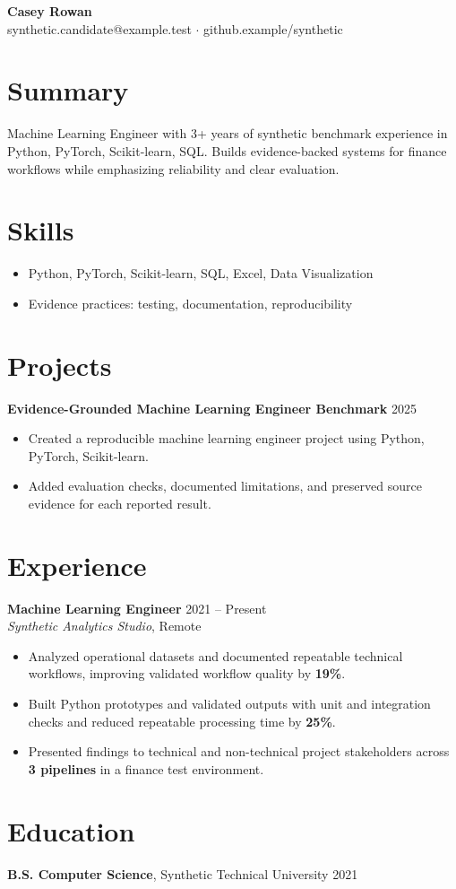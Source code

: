 \documentclass[10pt,letterpaper]{article}
\begin{document}
\begin{center}
{\Large \textbf{Casey Rowan}}\\
synthetic.candidate@example.test $\cdot$ github.example/synthetic
\end{center}

\section*{Summary}
Machine Learning Engineer with 3+ years of synthetic benchmark experience in Python, PyTorch, Scikit-learn, SQL. Builds evidence-backed systems for finance workflows while emphasizing reliability and clear evaluation.

\section*{Skills}
\begin{itemize}
  \item Python, PyTorch, Scikit-learn, SQL, Excel, Data Visualization
  \item Evidence practices: testing, documentation, reproducibility
\end{itemize}

\section*{Projects}
\textbf{Evidence-Grounded Machine Learning Engineer Benchmark} \hfill 2025
\begin{itemize}
  \item Created a reproducible machine learning engineer project using Python, PyTorch, Scikit-learn.
  \item Added evaluation checks, documented limitations, and preserved source evidence for each reported result.
\end{itemize}

\section*{Experience}
\textbf{Machine Learning Engineer} \hfill 2021 -- Present\\
\textit{Synthetic Analytics Studio}, Remote
\begin{itemize}
  \item Analyzed operational datasets and documented repeatable technical workflows, improving validated workflow quality by \textbf{19\%}.
  \item Built Python prototypes and validated outputs with unit and integration checks and reduced repeatable processing time by \textbf{25\%}.
  \item Presented findings to technical and non-technical project stakeholders across \textbf{3 pipelines} in a finance test environment.
\end{itemize}

\section*{Education}
\textbf{B.S. Computer Science}, Synthetic Technical University \hfill 2021
\end{document}
